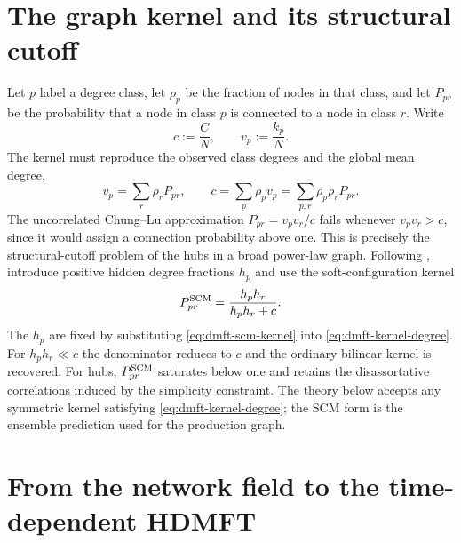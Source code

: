 \section{The graph kernel and its structural cutoff}
\label{sec:dmft-kernel}

Let $p$ label a degree class, let $\rho_p$ be the fraction of nodes in that class, and let
$P_{pr}$ be the probability that a node in class $p$ is connected to a node in class $r$.
Write
\begin{equation}
    c:=\frac{C}{N},\qquad v_p:=\frac{k_p}{N}.
\end{equation}
The kernel must reproduce the observed class degrees and the global mean degree,
\begin{equation}
    v_p=\sum_r\rho_rP_{pr},\qquad
    c=\sum_p\rho_pv_p=\sum_{p,r}\rho_p\rho_rP_{pr}.
    \label{eq:dmft-kernel-degree}
\end{equation}
The uncorrelated Chung--Lu approximation $P_{pr}=v_pv_r/c$ fails whenever
$v_pv_r>c$, since it would assign a connection probability above one.  This is precisely the
structural-cutoff problem of the hubs in a broad power-law graph.  Following \citet{patil2026},
introduce positive hidden degree fractions $h_p$ and use the soft-configuration kernel
\begin{equation}
    P_{pr}^{\rm SCM}=\frac{h_ph_r}{h_ph_r+c}.
    \label{eq:dmft-scm-kernel}
\end{equation}
The $h_p$ are fixed by substituting \eqref{eq:dmft-scm-kernel} into
\eqref{eq:dmft-kernel-degree}.  For $h_ph_r\ll c$ the denominator reduces to $c$ and the
ordinary bilinear kernel is recovered.  For hubs, $P_{pr}^{\rm SCM}$ saturates below one and
retains the disassortative correlations induced by the simplicity constraint.  The theory below
accepts any symmetric kernel satisfying \eqref{eq:dmft-kernel-degree}; the SCM form is the
ensemble prediction used for the production graph.

\section{From the network field to the time-dependent HDMFT}
\label{sec:dmft-cavity}

